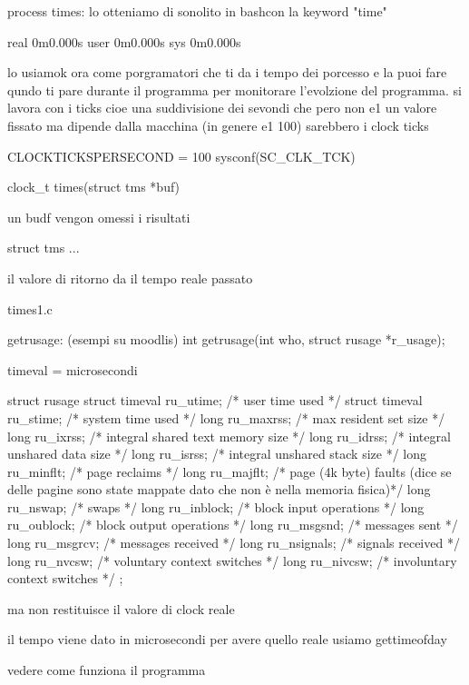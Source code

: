 process times:
lo otteniamo di sonolito in bashcon la keyword "time"

real	0m0.000s
user	0m0.000s
sys	0m0.000s

lo usiamok ora come porgramatori che ti da i tempo dei porcesso e la puoi fare qundo ti pare durante il programma per monitorare l'evolzione del programma. si lavora con i ticks cioe una suddivisione dei sevondi che pero non e1 un valore fissato ma dipende dalla macchina (in genere e1 100) sarebbero i clock ticks

CLOCKTICKSPERSECOND = 100
sysconf(SC_CLK_TCK)

clock_t times(struct tms *buf)

un budf vengon omessi i risultati

struct tms {
	...
}

il valore di ritorno da il tempo reale passato

times1.c


getrusage: (esempi su moodlis)
int getrusage(int who, struct rusage *r_usage);

timeval = microsecondi

struct rusage {
             struct timeval ru_utime; /* user time used */
             struct timeval ru_stime; /* system time used */
             long ru_maxrss;          /* max resident set size */
             long ru_ixrss;           /* integral shared text memory size */
             long ru_idrss;           /* integral unshared data size */
             long ru_isrss;           /* integral unshared stack size */
             long ru_minflt;          /* page reclaims */
	     long ru_majflt;          /* page (4k byte) faults (dice se delle pagine sono state mappate dato che non è nella memoria fisica)*/
             long ru_nswap;           /* swaps */
             long ru_inblock;         /* block input operations */
             long ru_oublock;         /* block output operations */
             long ru_msgsnd;          /* messages sent */
             long ru_msgrcv;          /* messages received */
             long ru_nsignals;        /* signals received */
             long ru_nvcsw;           /* voluntary context switches */
             long ru_nivcsw;          /* involuntary context switches */
};

ma non restituisce il valore di clock reale

il tempo viene dato in microsecondi per avere quello reale usiamo gettimeofday


vedere come funziona il programma




























